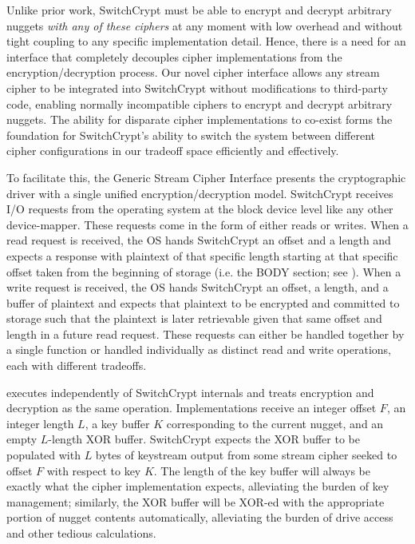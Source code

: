 
Unlike prior work, SwitchCrypt must be able to encrypt and decrypt arbitrary
nuggets \emph{with any of these ciphers} at any moment with low overhead and
without tight coupling to any specific implementation detail.  Hence, there is a
need for an interface that completely decouples cipher implementations from the
encryption/decryption process. Our novel cipher interface allows any stream
cipher to be integrated into SwitchCrypt without modifications to third-party
code, enabling normally incompatible ciphers to encrypt and decrypt arbitrary
nuggets. The ability for disparate cipher implementations to co-exist forms the
foundation for SwitchCrypt's ability to switch the system between different
cipher configurations in our tradeoff space efficiently and effectively.

To facilitate this, the Generic Stream Cipher Interface presents the
cryptographic driver with a single unified encryption/decryption model.
SwitchCrypt receives I/O requests from the operating system at the block device
level like any other device-mapper. These requests come in the form of either
reads or writes. When a read request is received, the OS hands SwitchCrypt an
offset and a length and expects a response with plaintext of that specific
length starting at that specific offset taken from the beginning of storage
(i.e. the BODY section; see ). When a write request is
received, the OS hands SwitchCrypt an offset, a length, and a buffer of
plaintext and expects that plaintext to be encrypted and committed to storage
such that the plaintext is later retrievable given that same offset and length
in a future read request. These requests can either be handled together by a
single function or handled individually as distinct read and write operations,
each with different tradeoffs.


 executes independently of SwitchCrypt
internals and treats encryption and decryption as the same
operation. Implementations receive an integer offset $F$, an integer
length $L$, a key buffer $K$ corresponding to the current nugget, and an
empty $L$-length XOR buffer. SwitchCrypt expects the XOR buffer to be
populated with $L$ bytes of keystream output from some stream cipher
seeked to offset $F$ with respect to key $K$. The length of the key buffer
will always be exactly what the cipher implementation expects, alleviating
the burden of key management; similarly, the XOR buffer will be XOR-ed
with the appropriate portion of nugget contents automatically, alleviating
the burden of drive access and other tedious calculations.



